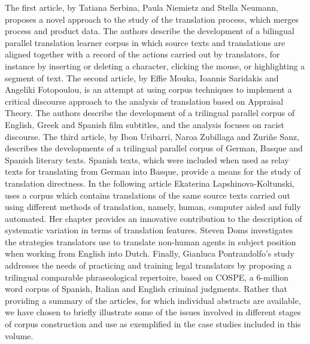\begin{refsection}
The first article, by Tatiana Serbina, Paula Niemietz and Stella Neumann, proposes a novel approach to the study of the translation process, which merges process and product data. The authors describe the development of a bilingual parallel translation learner corpus in which source texts and translations are aligned together with a record of the actions carried out by translators, for instance by inserting or deleting a character, clicking the mouse, or highlighting a segment of text. The second article, by Effie Mouka, Ioannis Saridakis and Angeliki Fotopoulou, is an attempt at using corpus techniques to implement a critical discourse approach to the analysis of translation based on Appraisal Theory. The authors describe the development of a trilingual parallel corpus of English, Greek and Spanish film subtitles, and the analysis focuses on racist discourse. The third article, by Ibon Uribarri, Naroa Zubillaga and Zuriñe Sanz, describes the developments of a trilingual parallel corpus of German, Basque and Spanish literary texts. Spanish texts, which were included when used as relay texts for translating from German into Basque, provide a means for the study of translation directness. In the following article Ekaterina Lapshinova-Koltunski, uses a corpus which contains translations of the same source texts carried out using different methods of translation, namely, human, computer aided and fully automated. Her chapter provides an innovative contribution to the description of systematic variation in terms of translation features. Steven Doms investigates the strategies translators use to translate non-human agents in subject position when working from English into Dutch. Finally, Gianluca Pontrandolfo’s study addresses the needs of practicing and training legal translators by proposing a trilingual comparable phraseological repertoire, based on COSPE, a 6-million word corpus of Spanish, Italian and English criminal judgments.
Rather that providing a summary of the articles, for which individual abstracts are available, we have chosen to briefly illustrate some of the issues involved in different stages of corpus construction and use as exemplified in the case studies included in this volume.

\printbibliography[heading=subbibliography]
\end{refsection} 
